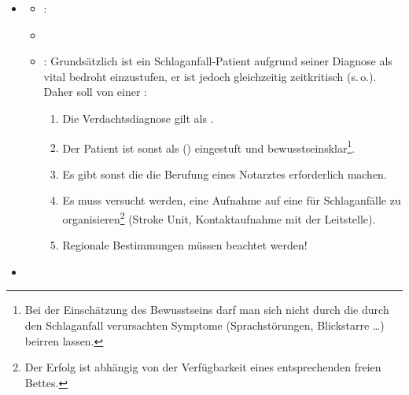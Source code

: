 \documentclass[
ngerman,
paper=a4,
asymmetric,
fontsize=10pt,
headings=small,
draft=false,
numbers=noenddot,
bibtotocnumbered,
footnotes=multiple,
]{scrreprt}
\begin{document}
\begin{enumerate}
{\begin{itemize}
  \item \TxMassVitMKBes
  \begin{itemize}
    \item {}: 
    \item {} 
    \item {}: Grundsätzlich ist ein
    Schlaganfall-Patient aufgrund seiner Diagnose als vital
    bedroht einzustufen, er ist jedoch gleichzeitig zeitkritisch (s.\,o.).
    Daher soll von einer
    :
    \begin{enumerate}
      \item Die Verdachtsdiagnose gilt als .
      \item Der Patient ist sonst als  () eingestuft
      und
      bewusstseinsklar\footnote{Bei der Einschätzung des Bewusstseins
      darf man sich nicht durch die durch den Schlaganfall
      verursachten Symptome (Sprachstörungen, Blickstarre \ldots)
      beirren lassen.}.
      \item Es gibt sonst  die die Berufung
      eines Notarztes erforderlich machen.
      \item Es muss versucht werden, eine Aufnahme auf eine
       für Schlaganfälle zu
      organisieren\footnote{Der Erfolg ist abhängig von der
      Verfügbarkeit eines entsprechenden freien Bettes.} (Stroke Unit,
      Kontaktaufnahme mit der Leitstelle).
      \item Regionale Bestimmungen müssen beachtet werden!
    \end{enumerate}
  \end{itemize}
  \item  {}
\end{itemize}}
\end{enumerate}
\end{document}
